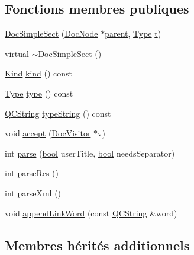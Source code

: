 \subsection*{Fonctions membres publiques}
\begin{DoxyCompactItemize}
\item 
\hyperlink{class_doc_simple_sect_a0ef58433b1e5f366b593d17a9ba4b9e1}{Doc\+Simple\+Sect} (\hyperlink{class_doc_node}{Doc\+Node} $\ast$\hyperlink{class_doc_node_a990d8b983962776a647e6231d38bd329}{parent}, \hyperlink{class_doc_simple_sect_a3b9f9dd4952f3d819b347f74a6769a9b}{Type} \hyperlink{058__bracket__recursion_8tcl_a69e959f6901827e4d8271aeaa5fba0fc}{t})
\item 
virtual \hyperlink{class_doc_simple_sect_a5b8a0f80776d4071348a14ce769f61f7}{$\sim$\+Doc\+Simple\+Sect} ()
\item 
\hyperlink{class_doc_node_aebd16e89ca590d84cbd40543ea5faadb}{Kind} \hyperlink{class_doc_simple_sect_adf5bfabb7a7bbb3deb064746aea10fb8}{kind} () const 
\item 
\hyperlink{class_doc_simple_sect_a3b9f9dd4952f3d819b347f74a6769a9b}{Type} \hyperlink{class_doc_simple_sect_a0dffdc45b4639e500e4d033616688808}{type} () const 
\item 
\hyperlink{class_q_c_string}{Q\+C\+String} \hyperlink{class_doc_simple_sect_abff4299d4d90b70dfa44ff56fb9baebc}{type\+String} () const 
\item 
void \hyperlink{class_doc_simple_sect_a83c0f2c289b0d15403d1adf94c98982d}{accept} (\hyperlink{class_doc_visitor}{Doc\+Visitor} $\ast$v)
\item 
int \hyperlink{class_doc_simple_sect_a6d4285005170976f90f3aa926a7be8c0}{parse} (\hyperlink{qglobal_8h_a1062901a7428fdd9c7f180f5e01ea056}{bool} user\+Title, \hyperlink{qglobal_8h_a1062901a7428fdd9c7f180f5e01ea056}{bool} needs\+Separator)
\item 
int \hyperlink{class_doc_simple_sect_a781284e66505901d40fd6d9df8663b3e}{parse\+Rcs} ()
\item 
int \hyperlink{class_doc_simple_sect_a5cdcf0db314a3f9721842c3134550ce2}{parse\+Xml} ()
\item 
void \hyperlink{class_doc_simple_sect_ae538f74c2d44222c9a45ef304c89e041}{append\+Link\+Word} (const \hyperlink{class_q_c_string}{Q\+C\+String} \&word)
\end{DoxyCompactItemize}
\subsection*{Membres hérités additionnels}


